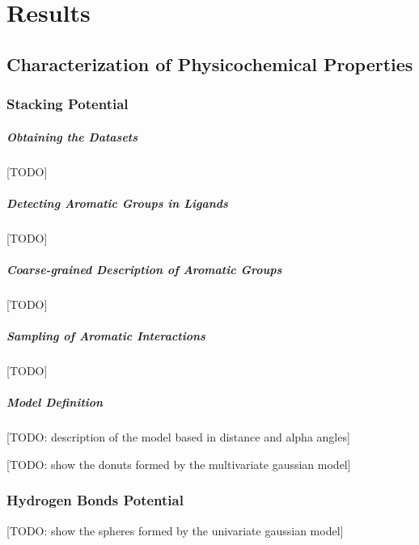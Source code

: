\chapter{Results} %

\section{Characterization of Physicochemical Properties}
  \subsection{Stacking Potential}
    \paragraph*{Obtaining the Datasets}
      [TODO]

    \paragraph*{Detecting Aromatic Groups in Ligands}
      [TODO]

    \paragraph*{Coarse-grained Description of Aromatic Groups}
      [TODO]

    \paragraph*{Sampling of Aromatic Interactions}
      [TODO]

    \paragraph*{Model Definition}
      [TODO: description of the model based in distance and alpha angles]

      [TODO: show the donuts formed by the multivariate gaussian model]

  \subsection{Hydrogen Bonds Potential}
    [TODO: show the spheres formed by the univariate gaussian model]

